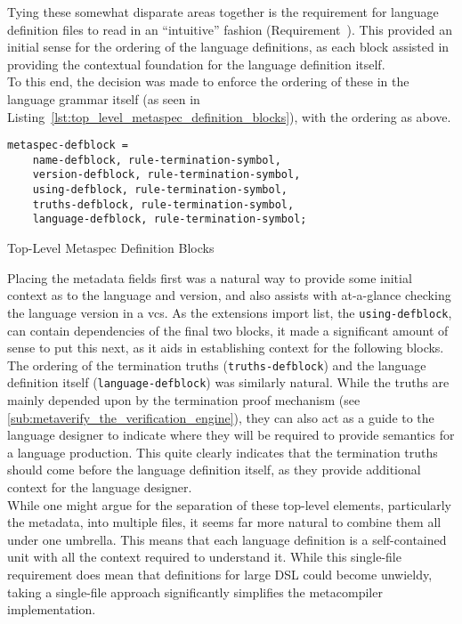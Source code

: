 Tying these somewhat disparate areas together is the requirement for language definition files to read in an ``intuitive'' fashion (Requirement~). 
This provided an initial sense for the ordering of the language definitions, as each block assisted in providing the contextual foundation for the language definition itself. \\

To this end, the decision was made to enforce the ordering of these in the language grammar itself (as seen in Listing~\ref{lst:top_level_metaspec_definition_blocks}), with the ordering as above.

\begin{listing}[!htb]
\begin{verbatim}
metaspec-defblock = 
    name-defblock, rule-termination-symbol, 
    version-defblock, rule-termination-symbol, 
    using-defblock, rule-termination-symbol, 
    truths-defblock, rule-termination-symbol, 
    language-defblock, rule-termination-symbol;
\end{verbatim}
\caption{Top-Level Metaspec Definition Blocks}
\label{lst:top_level_metaspec_definition_blocks}
\end{listing}

Placing the metadata fields first was a natural way to provide some initial context as to the language and version, and also assists with at-a-glance checking the language version in a \gls{vcs}.
As the extensions import list, the \texttt{using-defblock}, can contain dependencies of the final two blocks, it made a significant amount of sense to put this next, as it aids in establishing context for the following blocks.\\

The ordering of the termination truths (\texttt{truths-defblock}) and the language definition itself (\texttt{language-defblock}) was similarly natural. 
While the truths are mainly depended upon by the termination proof mechanism (see \autoref{sub:metaverify_the_verification_engine}), they can also act as a guide to the language designer to indicate where they will be required to provide semantics for a language production. 
This quite clearly indicates that the termination truths should come before the language definition itself, as they provide additional context for the language designer.\\

While one might argue for the separation of these top-level elements, particularly the metadata, into multiple files, it seems far more natural to combine them all under one umbrella.
This means that each language definition is a self-contained unit with all the context required to understand it. 
While this single-file requirement does mean that definitions for large DSL could become unwieldy, taking a single-file approach significantly simplifies the metacompiler implementation.\\

